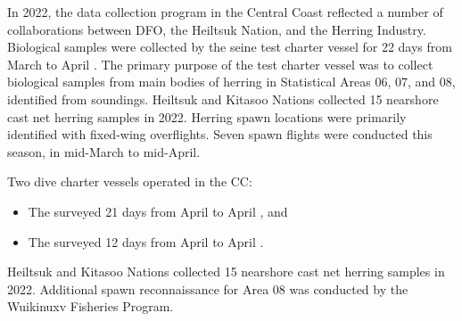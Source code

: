 In 2022, the data collection program in the Central Coast
reflected a number of collaborations between
DFO, the Heiltsuk Nation, and the Herring Industry.
Biological samples were collected by the seine test charter vessel
 for 22 days from March  to April .
The primary purpose of the test charter vessel was to
collect biological samples from main bodies of herring in
Statistical Areas 06, 07, and 08, identified from soundings.
Heiltsuk and Kitasoo Nations collected 15 nearshore
cast net herring samples in 2022.
Herring spawn locations were primarily identified with fixed-wing overflights.
Seven spawn flights were conducted this season, in mid-March to mid-April.

Two dive charter vessels operated in the CC:

\begin{itemize}

\item The  surveyed 21 days from April  to April , and

\item The  surveyed 12 days from April  to April .

\end{itemize}

Heiltsuk and Kitasoo Nations collected
15 nearshore cast net herring samples in 2022.
Additional spawn reconnaissance for Area 08
was conducted by the Wuikinuxv Fisheries Program.
